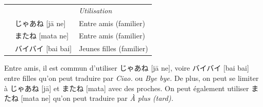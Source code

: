 \documentclass[a4paper,11pt,final]{article}
\newcommand{\romaji}[1]{{\footnotesize[#1]}}
\begin{document}
\hspace{5mm}\begin{tabular}{|p{2cm}p{4.5cm}l}
	\multicolumn{1}{l}{}&& \it\small Utilisation \\
					& じゃあね \romaji{j\=a ne}				& Entre amis (familier) \\
					& またね \romaji{mata ne}					& Entre amis (familier) \\
					& バイバイ \romaji{bai bai}				& Jeunes filles (familier)
\end{tabular}

Entre amis, il est commun d'utiliser じゃあね \romaji{j\=a ne}, voire バイバイ \romaji{bai bai} entre filles qu'on peut traduire par \og\textit{Ciao.}\fg{} ou \og\textit{Bye bye.}\fg{} De plus, on peut se limiter à じゃあね \romaji{j\=a} et またね \romaji{mata} avec des proches. On peut également utiliser またね \romaji{mata ne} qu'on peut traduire par \og\textit{À plus (tard).}\fg{}
\end{document}
